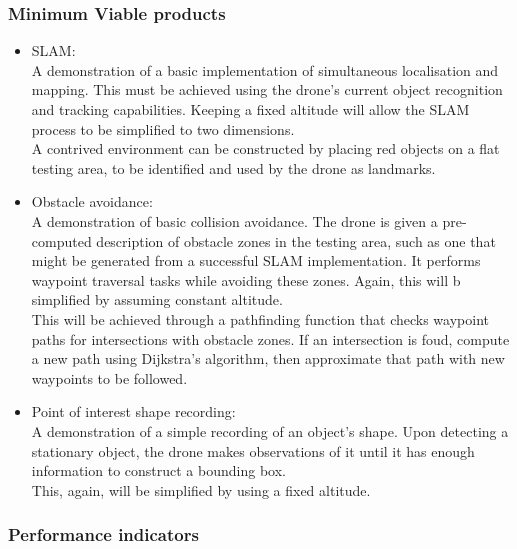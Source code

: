 \documentclass[a4paper, 12pt, titlepage]{article}
\begin{document}
		\subsubsection{Minimum Viable products} 
		\begin{itemize}
		\item SLAM:
		\\A demonstration of a basic implementation of simultaneous localisation and mapping\cite{Blas}. This must be achieved using the drone's current object recognition and tracking capabilities. Keeping a fixed altitude will allow the SLAM process to be simplified to two dimensions. 
		\\A contrived environment can be constructed by placing red objects on a flat testing area, to be identified and used by the drone as landmarks.
		
  		\item Obstacle avoidance:
  		\\A demonstration of basic collision avoidance. The drone is given a pre-computed description of obstacle zones in the testing area, such as one that might be generated from a successful SLAM implementation. It performs waypoint traversal tasks while avoiding these zones. Again, this will b simplified by assuming constant altitude.
  		\\This will be achieved through a pathfinding function that checks waypoint paths for intersections with obstacle zones. If an intersection is foud, compute a new path using Dijkstra's algorithm\cite{Dijkstra}, then approximate that path with new waypoints to be followed.
  		
  		\item Point of interest shape recording:
  		\\A demonstration of a simple recording of an object's shape. Upon detecting a stationary object, the drone makes observations of it until it has enough information to construct a bounding box.
  		\\This, again, will be simplified by using a fixed altitude.
  		\end{itemize}
  		
  		\subsubsection{Performance indicators}
  		
\end{document}
